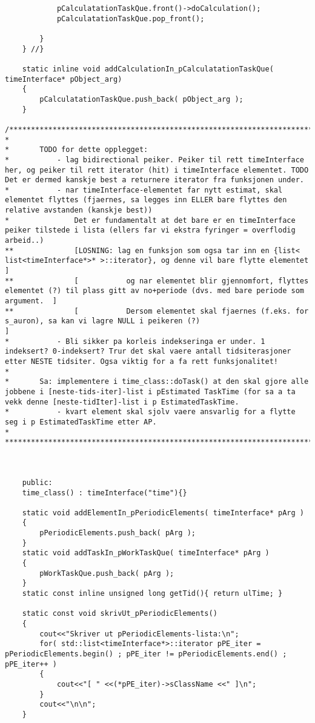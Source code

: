 \begin{lstlisting}
			pCalculatationTaskQue.front()->doCalculation();
			pCalculatationTaskQue.pop_front();
		
		}
	} //}

	static inline void addCalculationIn_pCalculatationTaskQue( timeInterface* pObject_arg)
	{
	 	pCalculatationTaskQue.push_back( pObject_arg );
	}

/***************************************************************************
*
* 		TODO for dette opplegget:
* 			- lag bidirectional peiker. Peiker til rett timeInterface her, og peiker til rett iterator (hit) i timeInterface elementet. TODO Det er dermed kanskje best a returnere iterator fra funksjonen under.
* 			- nar timeInterface-elementet far nytt estimat, skal elementet flyttes (fjaernes, sa legges inn ELLER bare flyttes den relative avstanden (kanskje best))
* 				Det er fundamentalt at det bare er en timeInterface peiker tilstede i lista (ellers far vi ekstra fyringer = overflodig arbeid..) 
** 				[LOSNING: lag en funksjon som ogsa tar inn en {list< list<timeInterface*>* >::iterator}, og denne vil bare flytte elementet 			]
** 				[ 			og nar elementet blir gjennomfort, flyttes elementet (?) til plass gitt av no+periode (dvs. med bare periode som argument. 	]
** 				[ 			Dersom elementet skal fjaernes (f.eks. for s_auron), sa kan vi lagre NULL i peikeren (?) 									]
* 			- Bli sikker pa korleis indekseringa er under. 1 indeksert? 0-indeksert? Trur det skal vaere antall tidsiterasjoner etter NESTE tidsiter. Ogsa viktig for a fa rett funksjonalitet!
*
* 		Sa: implementere i time_class::doTask() at den skal gjore alle jobbene i [neste-tids-iter]-list i pEstimated TaskTime (for sa a ta vekk denne [neste-tidIter]-list i p EstimatedTaskTime.
* 			- kvart element skal sjolv vaere ansvarlig for a flytte seg i p EstimatedTaskTime etter AP.
*
****************************************************************************/



	public:
	time_class() : timeInterface("time"){}

	static void addElementIn_pPeriodicElements( timeInterface* pArg )
	{
		pPeriodicElements.push_back( pArg );
	}
	static void addTaskIn_pWorkTaskQue( timeInterface* pArg )
	{
	 	pWorkTaskQue.push_back( pArg );
	}
	static const inline unsigned long getTid(){ return ulTime; }
	
	static const void skrivUt_pPeriodicElements()
	{
		cout<<"Skriver ut pPeriodicElements-lista:\n";
		for( std::list<timeInterface*>::iterator pPE_iter = pPeriodicElements.begin() ; pPE_iter != pPeriodicElements.end() ; pPE_iter++ )
		{
			cout<<"[ " <<(*pPE_iter)->sClassName <<" ]\n";
		}
		cout<<"\n\n";
	}


\end{lstlisting}
